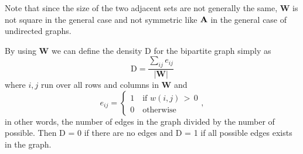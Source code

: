Note that since the size of the two adjacent sets are not generally the same, $\textbf{W}$ is not square in the general case and not symmetric like $\textbf{A}$ in the general case of undirected graphs.

By using $\textbf{W}$ we can define the density D for the bipartite graph simply as 
$$\text{D} = \frac{\sum_{ij}e_{ij}}{|\textbf{W}|}
$$
where $i,j$ run over all rows and columns in $\textbf{W}$ and
$$e_{ij} =
    \left\{
        \begin{matrix}
            1\quad \text{if $w(i,j)\, >\, 0$} \\
            0\quad \text{otherwise}
        \end{matrix}
    \right. ,
$$
in other words, the number of edges in the graph divided by the number of possible. Then D = 0 if there are no edges and D = 1 if all possible edges exists in the graph.
